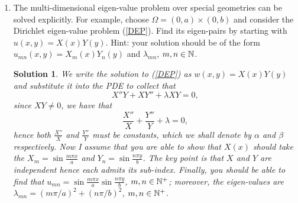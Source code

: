 \documentclass[6pt]{article}
\newtheorem{solution}{Solution}
\numberwithin{equation}{section}
\def\mathbb{\Bbb}
\begin{document}
\begin{enumerate}
\item The multi-dimensional eigen-value problem over special geometries can be solved explicitly.  For example, choose $\Omega=(0,a)\times(0,b)$ and consider the Dirichlet eigen-value problem (\ref{DEP}).  Find its eigen-pairs by starting with $u(x,y)=X(x)Y(y)$.  Hint: your solution should be of the form $u_{mn}(x,y)=X_m(x)Y_n(y)$ and $\lambda_{mn}$, $m,n\in\mathbb N$.
\begin{solution}
We write the solution to (\ref{DEP}) as $w(x,y)=X(x)Y (y)$ and substitute it into the PDE to collect
that
\[X''Y+XY''+\lambda XY=0,\]
since $XY \neq 0$, we have that
\[\frac{X''}{X}+\frac{Y''}{Y}+\lambda=0,\]
hence both $\frac{X''}{X}$ and $\frac{Y''}{Y}$ must be constants, which we shall denote by $\alpha$ and $\beta$ respectively.  Now I assume that you are able to show that $X(x)$ should take the
$X_m=\sin \frac{m\pi x}{a}$  and $Y_n=\sin \frac{n\pi y}{b}$.  The key point is that $X$ and $Y$ are independent hence each admits its sub-index.   Finally, you should be able to find that $u_{mn}=\sin \frac{m\pi x}{a}\sin \frac{n\pi y}{b}$, $m,n\in\mathbb N^+$; moreover, the eigen-values are $\lambda_{mn}=(m\pi/a)^2+(n\pi/b)^2$, $m,n\in\mathbb N^+$.
\end{solution}


\end{enumerate}
\end{document}
